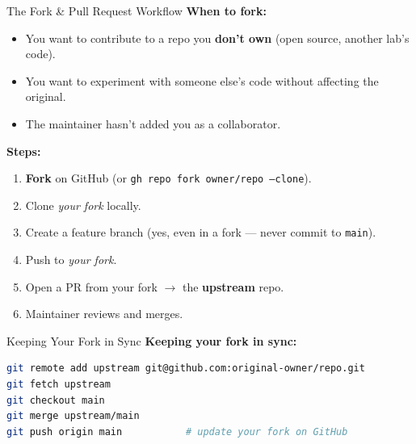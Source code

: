 \documentclass[aspectratio=169, 11pt]{beamer}
\begin{document}
\begin{frame}[fragile]{The Fork \& Pull Request Workflow}
  \textbf{When to fork:}
  \begin{itemize}
    \item You want to contribute to a repo you \textbf{don't own} (open source, another lab's code).
    \item You want to experiment with someone else's code without affecting the original.
    \item The maintainer hasn't added you as a collaborator.
  \end{itemize}

  \vspace{0.3em}
  \textbf{Steps:}
  \begin{enumerate}
    \item \textbf{Fork} on GitHub (or \texttt{gh repo fork owner/repo --clone}).
    \item Clone \emph{your fork} locally.
    \item Create a feature branch (yes, even in a fork --- never commit to \texttt{main}).
    \item Push to \emph{your fork}.
    \item Open a PR from your fork $\to$ the \textbf{upstream} repo.
    \item Maintainer reviews and merges.
  \end{enumerate}
\end{frame}

\begin{frame}[fragile]{Keeping Your Fork in Sync}
  \vspace{0.3em}
  \textbf{Keeping your fork in sync:}
  \begin{lstlisting}[language=bash]
git remote add upstream git@github.com:original-owner/repo.git
git fetch upstream
git checkout main
git merge upstream/main
git push origin main           # update your fork on GitHub
  \end{lstlisting}
\end{frame}
\end{document}
